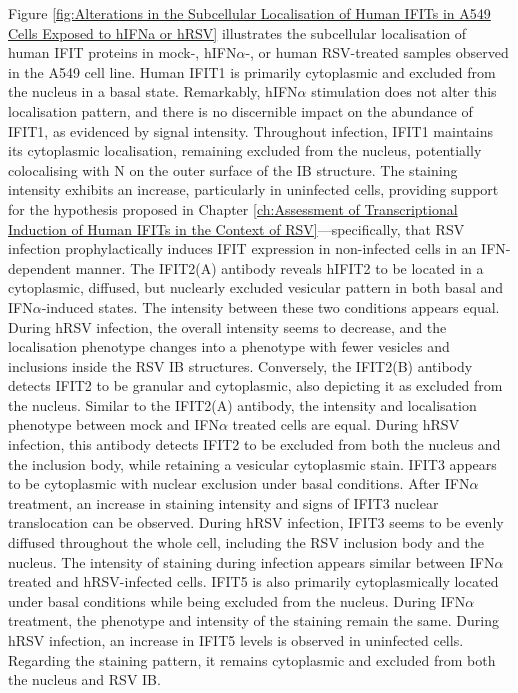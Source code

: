 Figure \ref{fig:Alterations in the Subcellular Localisation of Human IFITs in A549 Cells Exposed to hIFNa or hRSV} illustrates the subcellular localisation of human IFIT proteins in mock-, hIFN\(\alpha\)-, or human RSV-treated samples observed in the A549 cell line. Human IFIT1 is primarily cytoplasmic and excluded from the nucleus in a basal state. Remarkably, hIFN\(\alpha\) stimulation does not alter this localisation pattern, and there is no discernible impact on the abundance of IFIT1, as evidenced by signal intensity. Throughout infection, IFIT1 maintains its cytoplasmic localisation, remaining excluded from the nucleus, potentially colocalising with N on the outer surface of the IB structure. The staining intensity exhibits an increase, particularly in uninfected cells, providing support for the hypothesis proposed in Chapter \ref{ch:Assessment of Transcriptional Induction of Human IFITs in the Context of RSV}—specifically, that RSV infection prophylactically induces IFIT expression in non-infected cells in an IFN-dependent manner. The IFIT2(A) antibody reveals hIFIT2 to be located in a cytoplasmic, diffused, but nuclearly excluded vesicular pattern in both basal and IFN\(\alpha\)-induced states. The intensity between these two conditions appears equal. During hRSV infection, the overall intensity seems to decrease, and the localisation phenotype changes into a phenotype with fewer vesicles and inclusions inside the RSV IB structures. Conversely, the IFIT2(B) antibody detects IFIT2 to be granular and cytoplasmic, also depicting it as excluded from the nucleus. Similar to the IFIT2(A) antibody, the intensity and localisation phenotype between mock and IFN\(\alpha\) treated cells are equal. During hRSV infection, this antibody detects IFIT2 to be excluded from both the nucleus and the inclusion body, while retaining a vesicular cytoplasmic stain. IFIT3 appears to be cytoplasmic with nuclear exclusion under basal conditions. After IFN\(\alpha\) treatment, an increase in staining intensity and signs of IFIT3 nuclear translocation can be observed. During hRSV infection, IFIT3 seems to be evenly diffused throughout the whole cell, including the RSV inclusion body and the nucleus. The intensity of staining during infection appears similar between IFN\(\alpha\) treated and hRSV-infected cells. IFIT5 is also primarily cytoplasmically located under basal conditions while being excluded from the nucleus. During IFN\(\alpha\) treatment, the phenotype and intensity of the staining remain the same. During hRSV infection, an increase in IFIT5 levels is observed in uninfected cells. Regarding the staining pattern, it remains cytoplasmic and excluded from both the nucleus and RSV IB.

